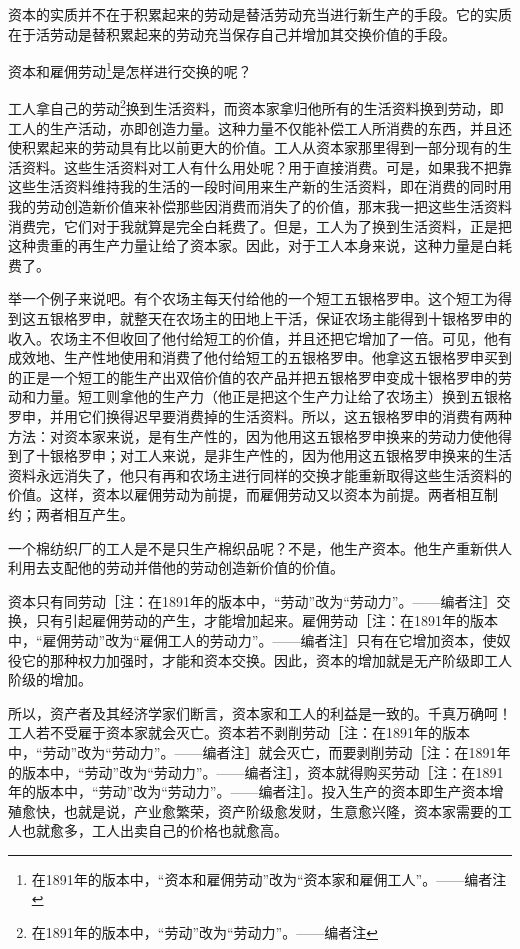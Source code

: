 \documentclass[a4paper,twoside,12pt,AutoFakeBold]{ctexart}
\begin{document}
资本的实质并不在于积累起来的劳动是替活劳动充当进行新生产的手段。它的实质在于活劳动是替积累起来的劳动充当保存自己并增加其交换价值的手段。

资本和雇佣劳动\footnote{在1891年的版本中，“资本和雇佣劳动”改为“资本家和雇佣工人”。——编者注}是怎样进行交换的呢？

工人拿自己的劳动\footnote{在1891年的版本中，“劳动”改为“劳动力”。——编者注}换到生活资料，而资本家拿归他所有的生活资料换到劳动，即工人的生产活动，亦即创造力量。这种力量不仅能补偿工人所消费的东西，并且还使积累起来的劳动具有比以前更大的价值。工人从资本家那里得到一部分现有的生活资料。这些生活资料对工人有什么用处呢？用于直接消费。可是，如果我不把靠这些生活资料维持我的生活的一段时间用来生产新的生活资料，即在消费的同时用我的劳动创造新价值来补偿那些因消费而消失了的价值，那末我一把这些生活资料消费完，它们对于我就算是完全白耗费了。但是，工人为了换到生活资料，正是把这种贵重的再生产力量让给了资本家。因此，对于工人本身来说，这种力量是白耗费了。

举一个例子来说吧。有个农场主每天付给他的一个短工五银格罗申。这个短工为得到这五银格罗申，就整天在农场主的田地上干活，保证农场主能得到十银格罗申的收入。农场主不但收回了他付给短工的价值，并且还把它增加了一倍。可见，他有成效地、生产性地使用和消费了他付给短工的五银格罗申。他拿这五银格罗申买到的正是一个短工的能生产出双倍价值的农产品并把五银格罗申变成十银格罗申的劳动和力量。短工则拿他的生产力（他正是把这个生产力让给了农场主）换到五银格罗申，并用它们换得迟早要消费掉的生活资料。所以，这五银格罗申的消费有两种方法：对资本家来说，是有生产性的，因为他用这五银格罗申换来的劳动力使他得到了十银格罗申；对工人来说，是非生产性的，因为他用这五银格罗申换来的生活资料永远消失了，他只有再和农场主进行同样的交换才能重新取得这些生活资料的价值。这样，资本以雇佣劳动为前提，而雇佣劳动又以资本为前提。两者相互制约；两者相互产生。

一个棉纺织厂的工人是不是只生产棉织品呢？不是，他生产资本。他生产重新供人利用去支配他的劳动并借他的劳动创造新价值的价值。

资本只有同劳动［注：在1891年的版本中，“劳动”改为“劳动力”。——编者注］交换，只有引起雇佣劳动的产生，才能增加起来。雇佣劳动［注：在1891年的版本中，“雇佣劳动”改为“雇佣工人的劳动力”。——编者注］只有在它增加资本，使奴役它的那种权力加强时，才能和资本交换。因此，资本的增加就是无产阶级即工人阶级的增加。

所以，资产者及其经济学家们断言，资本家和工人的利益是一致的。千真万确呵！工人若不受雇于资本家就会灭亡。资本若不剥削劳动［注：在1891年的版本中，“劳动”改为“劳动力”。——编者注］就会灭亡，而要剥削劳动［注：在1891年的版本中，“劳动”改为“劳动力”。——编者注］，资本就得购买劳动［注：在1891年的版本中，“劳动”改为“劳动力”。——编者注］。投入生产的资本即生产资本增殖愈快，也就是说，产业愈繁荣，资产阶级愈发财，生意愈兴隆，资本家需要的工人也就愈多，工人出卖自己的价格也就愈高。
\end{document}
